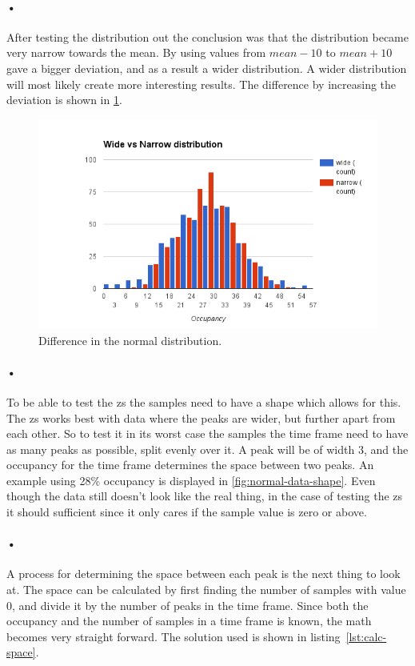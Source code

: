 \documentclass[a4paper, 12pt]{report}
\begin{document}
\paragraph{•}
After testing the distribution out the conclusion was that the distribution became very narrow towards the mean.
By using values from $mean-10$ to $mean+10$ gave a bigger deviation, and as a result a wider distribution.
A wider distribution will most likely create more interesting results.
The difference by increasing the deviation is shown in \ref{fig:distribution}.

\begin{figure}[h!]
	\centering
		\includegraphics[width=1.0\textwidth]{images/normal-dist-diff.png}
		\caption{Difference in the normal distribution.}
		\label{fig:distribution}
\end{figure}

\paragraph{•}
To be able to test the \gls{zs} the samples need to have a shape which allows for this.
The \gls{zs} works best with data where the peaks are wider, but further apart from each other.
So to test it in its worst case the samples the time frame need to have as many peaks as possible, split evenly over it.
A peak will be of width 3, and the occupancy for the time frame determines the space between two peaks.
An example using 28\% occupancy is displayed in \ref{fig:normal-data-shape}.
Even though the data still doesn't look like the real thing, in the case of testing the \gls{zs} it should sufficient since it only cares if the sample value is zero or above.

\paragraph{•}
A process for determining the space between each peak is the next thing to look at.
The space can be calculated by first finding the number of samples with value 0, and divide it by the number of peaks in the time frame.
Since both the occupancy and the number of samples in a time frame is known, the math becomes very straight forward.
The solution used is shown in listing~\ref{lst:calc-space}.
\end{document}
